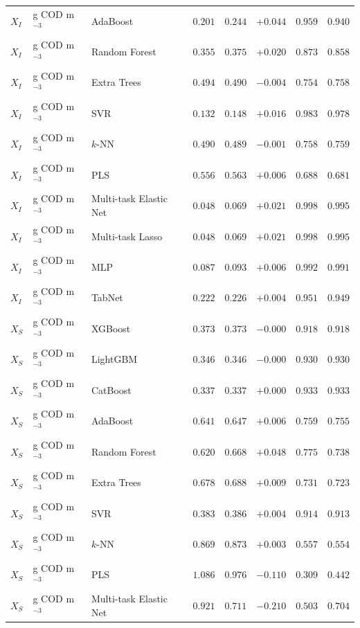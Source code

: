 \begin{longtable}{llp{3.1cm}rrrrr}
$X_{I}$ & g COD m$^{-3}$ & AdaBoost & $0.201$ & $0.244$ & $+0.044$ & $0.959$ & $0.940$ \\
$X_{I}$ & g COD m$^{-3}$ & Random Forest & $0.355$ & $0.375$ & $+0.020$ & $0.873$ & $0.858$ \\
$X_{I}$ & g COD m$^{-3}$ & Extra Trees & $0.494$ & $0.490$ & $-0.004$ & $0.754$ & $0.758$ \\
$X_{I}$ & g COD m$^{-3}$ & SVR & $0.132$ & $0.148$ & $+0.016$ & $0.983$ & $0.978$ \\
$X_{I}$ & g COD m$^{-3}$ & $k$-NN & $0.490$ & $0.489$ & $-0.001$ & $0.758$ & $0.759$ \\
$X_{I}$ & g COD m$^{-3}$ & PLS & $0.556$ & $0.563$ & $+0.006$ & $0.688$ & $0.681$ \\
$X_{I}$ & g COD m$^{-3}$ & Multi-task Elastic Net & $0.048$ & $0.069$ & $+0.021$ & $0.998$ & $0.995$ \\
$X_{I}$ & g COD m$^{-3}$ & Multi-task Lasso & $0.048$ & $0.069$ & $+0.021$ & $0.998$ & $0.995$ \\
$X_{I}$ & g COD m$^{-3}$ & MLP & $0.087$ & $0.093$ & $+0.006$ & $0.992$ & $0.991$ \\
$X_{I}$ & g COD m$^{-3}$ & TabNet & $0.222$ & $0.226$ & $+0.004$ & $0.951$ & $0.949$ \\
$X_{S}$ & g COD m$^{-3}$ & XGBoost & $0.373$ & $0.373$ & $-0.000$ & $0.918$ & $0.918$ \\
$X_{S}$ & g COD m$^{-3}$ & LightGBM & $0.346$ & $0.346$ & $-0.000$ & $0.930$ & $0.930$ \\
$X_{S}$ & g COD m$^{-3}$ & CatBoost & $0.337$ & $0.337$ & $+0.000$ & $0.933$ & $0.933$ \\
$X_{S}$ & g COD m$^{-3}$ & AdaBoost & $0.641$ & $0.647$ & $+0.006$ & $0.759$ & $0.755$ \\
$X_{S}$ & g COD m$^{-3}$ & Random Forest & $0.620$ & $0.668$ & $+0.048$ & $0.775$ & $0.738$ \\
$X_{S}$ & g COD m$^{-3}$ & Extra Trees & $0.678$ & $0.688$ & $+0.009$ & $0.731$ & $0.723$ \\
$X_{S}$ & g COD m$^{-3}$ & SVR & $0.383$ & $0.386$ & $+0.004$ & $0.914$ & $0.913$ \\
$X_{S}$ & g COD m$^{-3}$ & $k$-NN & $0.869$ & $0.873$ & $+0.003$ & $0.557$ & $0.554$ \\
$X_{S}$ & g COD m$^{-3}$ & PLS & $1.086$ & $0.976$ & $-0.110$ & $0.309$ & $0.442$ \\
$X_{S}$ & g COD m$^{-3}$ & Multi-task Elastic Net & $0.921$ & $0.711$ & $-0.210$ & $0.503$ & $0.704$ \\

\end{longtable}
